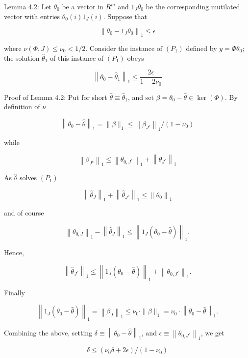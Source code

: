 \documentclass[10pt]{article}
\begin{document}
Lemma 4.2: Let $\theta_{0}$ be a vector in $R^{m}$ and $1_{J} \theta_{0}$ be the corresponding mutilated vector with entries $\theta_{0}(i) 1_{J}(i)$. Suppose that

$$
\left\|\theta_{0}-1_{J} \theta_{0}\right\|_{1} \leq \epsilon
$$

where $\nu(\Phi, J) \leq \nu_{0}<1 / 2$. Consider the instance of $\left(P_{1}\right)$ defined by $y=\Phi \theta_{0}$; the solution $\hat{\theta}_{1}$ of this instance of $\left(P_{1}\right)$ obeys


\begin{equation*}
\left\|\theta_{0}-\hat{\theta}_{1}\right\|_{1} \leq \frac{2 \epsilon}{1-2 \nu_{0}} \tag{IV.2}
\end{equation*}


Proof of Lemma 4.2: Put for short $\hat{\theta} \equiv \hat{\theta}_{1}$, and set $\beta=\theta_{0}-\hat{\theta} \in \operatorname{ker}(\Phi)$. By definition of $\nu$

$$
\left\|\theta_{0}-\hat{\theta}\right\|_{1}=\|\beta\|_{1} \leq\left\|\beta_{J^{c}}\right\|_{1} /\left(1-\nu_{0}\right)
$$

while

$$
\left\|\beta_{J^{c}}\right\|_{1} \leq\left\|\theta_{0, J^{c}}\right\|_{1}+\left\|\hat{\theta}_{J^{c}}\right\|_{1}
$$

As $\hat{\theta}$ solves $\left(P_{1}\right)$

$$
\left\|\hat{\theta}_{J}\right\|_{1}+\left\|\hat{\theta}_{J^{c}}\right\|_{1} \leq\left\|\theta_{0}\right\|_{1}
$$

and of course

$$
\left\|\theta_{0, J}\right\|_{1}-\left\|\hat{\theta}_{J}\right\|_{1} \leq\left\|1_{J}\left(\theta_{0}-\hat{\theta}\right)\right\|_{1} .
$$

Hence,

$$
\left\|\hat{\theta}_{J^{c}}\right\|_{1} \leq\left\|1_{J}\left(\theta_{0}-\hat{\theta}\right)\right\|_{1}+\left\|\theta_{0, J^{c}}\right\|_{1} .
$$

Finally

$$
\left\|1_{J}\left(\theta_{0}-\hat{\theta}\right)\right\|_{1}=\left\|\beta_{J}\right\|_{1} \leq \nu_{0} \cdot\|\beta\|_{1}=\nu_{0} \cdot\left\|\theta_{0}-\hat{\theta}\right\|_{1} .
$$

Combining the above, setting $\delta \equiv\left\|\theta_{0}-\hat{\theta}\right\|_{1}$, and $\epsilon \equiv\left\|\theta_{0, J^{c}}\right\|_{1}$, we get

$$
\delta \leq\left(\nu_{0} \delta+2 \epsilon\right) /\left(1-\nu_{0}\right)
$$
\end{document}
